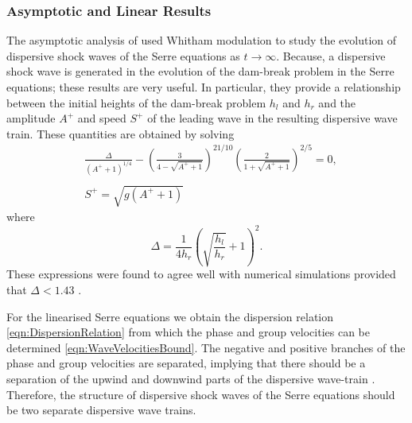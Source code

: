 \subsubsection{Asymptotic and Linear Results}
The asymptotic analysis of \citet{El-etal-2006} used Whitham modulation to study the evolution of dispersive shock waves of the Serre equations as $t\rightarrow \infty$. Because, a dispersive shock wave is generated in the evolution of the dam-break problem in the Serre equations; these results are very useful. In particular, they provide a relationship between the initial heights of the dam-break problem $h_l$ and $h_r$ and the amplitude $A^+$ and speed $S^+$ of the leading wave in the resulting dispersive wave train. These quantities are obtained by solving
\begin{subequations}
	\begin{align}
	&\frac{\Delta}{\left(A^+ + 1\right)^{1/4}} - \left(\frac{3}{4 -  \sqrt{A^+ + 1}}\right)^{21/10} \left(\frac{2}{1 + \sqrt{A^+ + 1}}\right)^{2/5} = 0,	\label{eqn:Aplusdef} \\  \nonumber \\
	&S^+ = \sqrt{g \left(A^+ + 1\right)}	\label{eqn:Splusdef}
	\end{align}
	\label{eqn:ELWhitMod}	
\end{subequations}
where
\begin{equation*}
\Delta = \frac{1}{4 h_r}\left(\sqrt{\dfrac{h_l}{h_r}} + 1\right)^2.
\end{equation*}
These expressions were found to agree well with numerical simulations provided that $\Delta < 1.43$ \cite{El-etal-2006}.

For the linearised Serre equations we obtain the dispersion relation \eqref{eqn:DispersionRelation} from which the phase and group velocities can be determined \eqref{eqn:WaveVelocitiesBound}. The negative and positive branches of the phase and group velocities are separated, implying that there should be a separation of the upwind and downwind parts of the dispersive wave-train \cite{Dougalis-etal-2007}. Therefore, the structure of dispersive shock waves of the Serre equations should be two separate dispersive wave trains.


